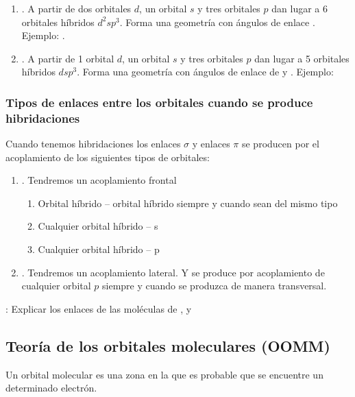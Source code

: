 \begin{enumerate}[label=\numberballmDarkBrown]
        \item {}.
        A partir de dos orbitales $d$, un orbital $s$ y tres orbitales $p$ dan lugar a 6 orbitales híbridos $d^2sp^3$.
        Forma una geometría  con ángulos de enlace .
        Ejemplo: .
        \item {}.
        A partir de 1 orbital $d$, un orbital $s$ y tres orbitales $p$ dan lugar a 5 orbitales híbridos $dsp^3$.
        Forma una geometría  con ángulos de enlace de  y .
        Ejemplo: 
\end{enumerate}

\subsubsection{Tipos de enlaces entre los orbitales cuando se produce hibridaciones}
Cuando tenemos hibridaciones los enlaces $\sigma$ y enlaces $\pi$ se producen por el acoplamiento de los siguientes tipos de orbitales:
\begin{enumerate}[label=\numberballmDarkTeal]
        \item {}.
        Tendremos un acoplamiento frontal
        \begin{enumerate}
            \item Orbital híbrido -- orbital híbrido siempre y cuando sean del mismo tipo
            \item Cualquier orbital híbrido -- s
            \item Cualquier orbital híbrido -- p
        \end{enumerate}
        \item {}.
        Tendremos un acoplamiento lateral.
        Y se produce por acoplamiento de cualquier orbital $p$ siempre y cuando se produzca de manera transversal.
\end{enumerate}

: Explicar los enlaces de las moléculas de ,  y 

\subsection{Teoría de los orbitales moleculares (OOMM)}\label{subsec:teoria-de-los-orbitales-moleculares-(oomm)}

Un orbital molecular es una zona en la que es probable que se encuentre un determinado electrón.

